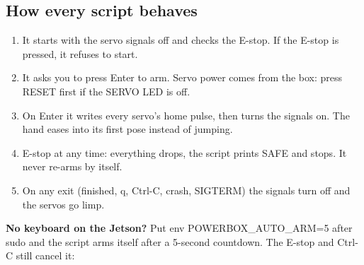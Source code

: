 \documentclass[11pt,letterpaper]{article}
\newcommand{\code}[1]{\textcolor{codeblue}{\ttfamily\smaller\relax #1}}
\begin{document}
\subsection{How every script behaves}
\begin{enumerate}
  \item It starts with the servo signals off and checks the E-stop. If the E-stop is pressed, it refuses to start.
  \item It asks you to press Enter to arm. Servo power comes from the box: press RESET first if the SERVO LED is off.
  \item On Enter it writes every servo's home pulse, then turns the signals on. The hand eases into its first pose instead of jumping.
  \item E-stop at any time: everything drops, the script prints SAFE and stops. It never re-arms by itself.
  \item On any exit (finished, \code{q}, Ctrl-C, crash, SIGTERM) the signals turn off and the servos go limp.
\end{enumerate}

\textbf{No keyboard on the Jetson?} Put \code{env POWERBOX\_\allowbreak{}AUTO\_\allowbreak{}ARM=\allowbreak{}5} after sudo and the script arms itself after a 5-second countdown. The E-stop and Ctrl-C still cancel it:

\end{document}

